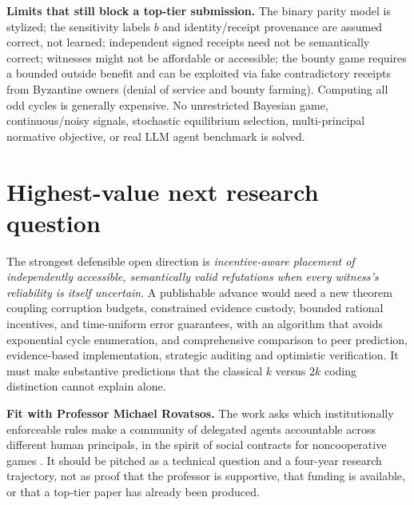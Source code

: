 \documentclass[10pt,a4paper]{article}
\begin{document}
\noindent\textbf{Limits that still block a top-tier submission.} The binary parity model is stylized; the sensitivity labels $b$ and identity/receipt provenance are assumed correct, not learned; independent signed receipts need not be semantically correct; witnesses might not be affordable or accessible; the bounty game requires a bounded outside benefit and can be exploited via fake contradictory receipts from Byzantine owners (denial of service and bounty farming). Computing all odd cycles is generally expensive. No unrestricted Bayesian game, continuous/noisy signals, stochastic equilibrium selection, multi-principal normative objective, or real LLM agent benchmark is solved.

\section{Highest-value next research question}
The strongest defensible open direction is \emph{incentive-aware placement of independently accessible, semantically valid refutations when every witness's reliability is itself uncertain}. A publishable advance would need a new theorem coupling corruption budgets, constrained evidence custody, bounded rational incentives, and time-uniform error guarantees, with an algorithm that avoids exponential cycle enumeration, and comprehensive comparison to peer prediction, evidence-based implementation, strategic auditing and optimistic verification. It must make substantive predictions that the classical $k$ versus $2k$ coding distinction cannot explain alone.

\textbf{Fit with Professor Michael Rovatsos.} The work asks which institutionally enforceable rules make a community of delegated agents accountable across different human principals, in the spirit of social contracts for noncooperative games \cite{davoust2020}. It should be pitched as a technical question and a four-year research trajectory, not as proof that the professor is supportive, that funding is available, or that a top-tier paper has already been produced.
\end{document}
